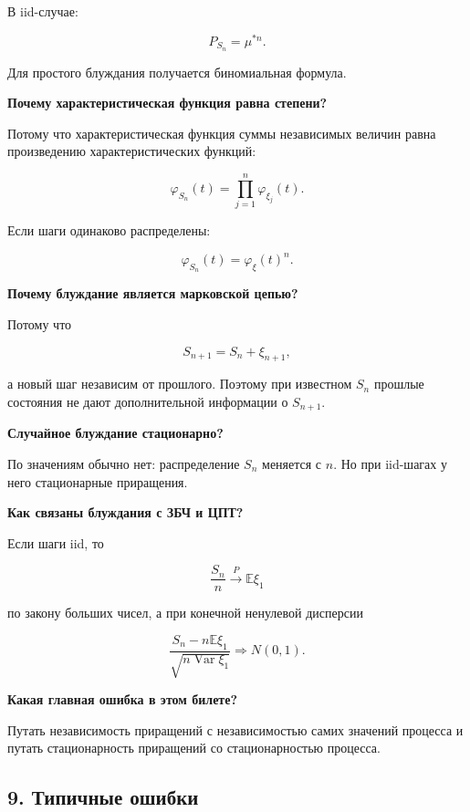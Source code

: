 \documentclass[
  11pt,
  a4paper,
]{article}
\begin{document}
В iid-случае:

\[
P_{S_n}=\mu^{*n}.
\]

Для простого блуждания получается биномиальная формула.

\textbf{Почему характеристическая функция равна степени?}

Потому что характеристическая функция суммы независимых величин равна
произведению характеристических функций:

\[
\varphi_{S_n}(t)
=
\prod_{j=1}^n\varphi_{\xi_j}(t).
\]

Если шаги одинаково распределены:

\[
\varphi_{S_n}(t)=\varphi_\xi(t)^n.
\]

\textbf{Почему блуждание является марковской цепью?}

Потому что

\[
S_{n+1}=S_n+\xi_{n+1},
\]

а новый шаг независим от прошлого. Поэтому при известном \(S_n\) прошлые
состояния не дают дополнительной информации о \(S_{n+1}\).

\textbf{Случайное блуждание стационарно?}

По значениям обычно нет: распределение \(S_n\) меняется с \(n\). Но при
iid-шагах у него стационарные приращения.

\textbf{Как связаны блуждания с ЗБЧ и ЦПТ?}

Если шаги iid, то

\[
\frac{S_n}{n}\xrightarrow{P}\mathbb E\xi_1
\]

по закону больших чисел, а при конечной ненулевой дисперсии

\[
\frac{S_n-n\mathbb E\xi_1}{\sqrt{n\operatorname{Var}\xi_1}}
\Rightarrow N(0,1).
\]

\textbf{Какая главная ошибка в этом билете?}

Путать независимость приращений с независимостью самих значений процесса
и путать стационарность приращений со стационарностью процесса.

\subsection{9. Типичные
ошибки}\label{ux442ux438ux43fux438ux447ux43dux44bux435-ux43eux448ux438ux431ux43aux438}
\end{document}
